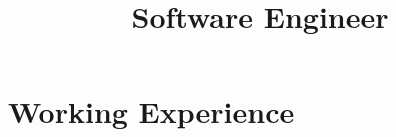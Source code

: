 \documentclass[sans]{moderncv}
\title{Software Engineer}
\begin{document}
\makecvtitle




\section{\faBriefcase{} Working Experience}










\end{document}
